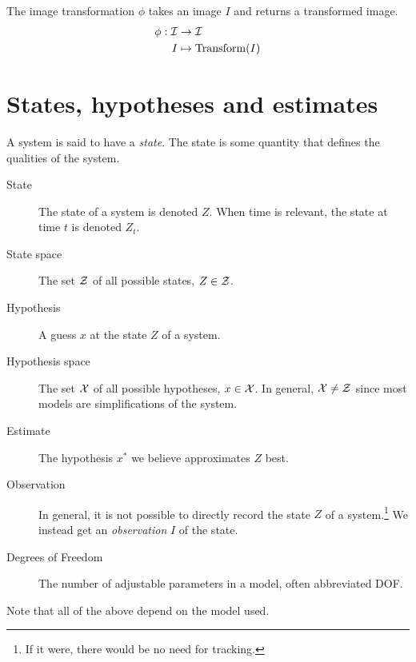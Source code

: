\begin{definition}
  The image transformation $\phi$ takes an image $I$ and returns a
  transformed image.
  \begin{equation}
    \begin{split}
      \phi : \mathcal{I} &\rightarrow \mathcal{I}\\
      I &\mapsto \text{Transform}(I)
    \end{split}
  \end{equation}
\end{definition}

\section{States, hypotheses and estimates}
A system is said to have a \emph{state}. The state is some quantity
that defines the qualities of the system.

\begin{description}
\item[State] The state of a system is denoted $Z$. When time is
  relevant, the state at time $t$ is denoted $Z_t$.
\item[State space] The set $\mathcal{Z}$ of all possible states, $Z \in \mathcal{Z}$.
\item[Hypothesis] A guess $x$ at the state $Z$ of a system.
\item[Hypothesis space] The set $\mathcal{X}$ of all possible hypotheses, $x
  \in \mathcal{X}$. In general, $\mathcal{X} \neq \mathcal{Z}$ since most models are
  simplifications of the system.
\item[Estimate] The hypothesis $x^*$ we believe approximates $Z$ best.
\item[Observation] In general, it is not possible to directly record
  the state $Z$ of a system.\footnote{If it were, there would be no
    need for tracking.} We instead get an \emph{observation} $I$ of
  the state.
\item[Degrees of Freedom] The number of adjustable parameters in a
  model, often abbreviated DOF.
\end{description}

Note that all of the above depend on the  model used.

%

